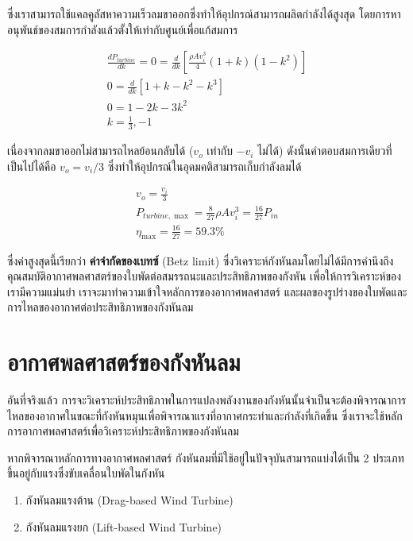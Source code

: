 \documentclass[a4paper,nobib,openany,10pt]{tufte-book}
\begin{document}
ซึ่งเราสามารถใช้แคลคูลัสหาความเร็วลมขาออกซึ่งทำให้อุปกรณ์สามารถผลิตกำลังได้สูงสุด
โดยการหาอนุพันธ์ของสมการกำลังแล้วตั้งให้เท่ากับศูนย์เพื่อแก้สมการ

\begin{gather*}
  \frac{dP_{turbine}}{dk} = 0 = \frac{d}{dk} \left[ \frac{\rho A v_i^3}{4} \left( 1 + k \right) \left( 1 - k^2 \right) \right] \\
  0 = \frac{d}{dk} \left[ 1 + k - k^2 - k^3 \right] \\
  0 = 1 - 2k - 3k^2 \\
  k = \frac{1}{3}, -1
\end{gather*}

เนื่องจากลมขาออกไม่สามารถไหลย้อนกลับได้ (\(v_o\) เท่ากับ \(-v_i\)
ไม่ได้) ดังนั้นคำตอบสมการเดียวที่เป็นไปได้คือ \(v_o = v_i /3\)
ซึ่งทำให้อุปกรณ์ในอุดมคติสามารถเก็บกำลังลมได้

\begin{gather*}
  v_o = \frac{v_i}{3} \\
  P_{turbine, \max} = \frac{8}{27} \rho A v_i^3 = \frac{16}{27} P_{in} \\
  \eta_{\max} = \frac{16}{27} = 59.3\%
\end{gather*}

ซึ่งค่าสูงสุดนี้เรียกว่า \textbf{ค่าจำกัดของเบทซ์} (Betz limit) ซึ่งวิเคราะห์กังหันลมโดยไม่ได้มีการคำนึงถึงคุณสมบัติอากาศพลศาสตร์ของใบพัดต่อสมรรถนะและประสิทธิภาพของกังหัน เพื่อให้การวิเคราะห์ของเรามีความแม่นยำ เราจะมาทำความเข้าใจหลักการของอากาศพลศาสตร์ และผลของรูปร่างของใบพัดและการไหลของอากาศต่อประสิทธิภาพของกังหันลม

\section{อากาศพลศาสตร์ของกังหันลม}
\label{sec:org4b8b207}
อันที่จริงแล้ว การจะวิเคราะห์ประสิทธิภาพในการแปลงพลังงานของกังหันนั้นจำเป็นจะต้องพิจารณาการไหลของอากาศในขณะที่กังหันหมุนเพื่อพิจารณาแรงที่อากาศกระทำและกำลังที่เกิดขึ้น ซึ่งเราจะใช้หลักการอากาศพลศาสตร์เพื่อวิเคราะห์ประสิทธิภาพของกังหันลม

หากพิจารณาหลักการทางอากาศพลศาสตร์ กังหันลมที่มีใช้อยู่ในปัจจุบันสามารถแบ่งได้เป็น 2 ประเภทขึ้นอยู่กับแรงซึ่งขับเคลื่อนใบพัดในกังหัน

\begin{enumerate}
\item กังหันลมแรงต้าน (Drag-based Wind Turbine)

\item กังหันลมแรงยก (Lift-based Wind Turbine)
\end{enumerate}
\end{document}
